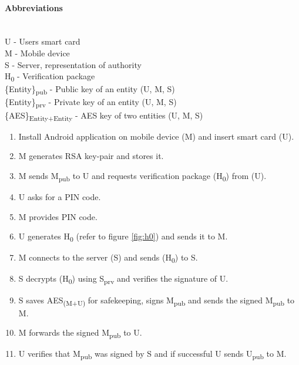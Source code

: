 \paragraph{Abbreviations}\mbox{}\\
U - Users smart card \\
M - Mobile device \\
S - Server, representation of authority \\
H\textsubscript{0} - Verification package \\
\{Entity\}\textsubscript{pub} - Public key of an entity (U, M, S)\\
\{Entity\}\textsubscript{prv} - Private key of an entity (U, M, S)\\
\{AES\}\textsubscript{Entity+Entity} - AES key of two entities (U, M, S)\\


\begin{enumerate}
  \item Install Android application on mobile device (M) and insert smart card (U).
  \item M generates RSA key-pair and stores it.
  \item M sends M\textsubscript{pub} to U and requests verification package (H\textsubscript{0}) from (U).
  \item U asks for a PIN code.
  \item M provides PIN code.
  \item U generates H\textsubscript{0} (refer to figure \ref{fig:h0}) and sends it to M.
  \item M connects to the server (S) and sends (H\textsubscript{0}) to S.
  \item S decrypts (H\textsubscript{0}) using S\textsubscript{prv} and verifies the signature of U.
  \item S saves AES\textsubscript{(M+U)} for safekeeping, signs M\textsubscript{pub} and sends the signed  M\textsubscript{pub} to M.
  \item M forwards the signed M\textsubscript{pub} to U.
  \item U verifies that M\textsubscript{pub} was signed by S and if successful U sends U\textsubscript{pub} to M.
\end{enumerate}

